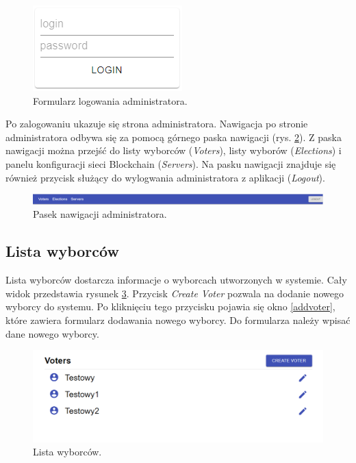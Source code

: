\documentclass[a4paper,12pt]{book}
\begin{document}
\begin{figure}[h]
	\centering
	\includegraphics[width=\textwidth]{images/adminlogin.png}
	\caption{Formularz logowania administratora.}\label{adminlogin}
\end {figure}

Po zalogowaniu ukazuje się strona administratora. Nawigacja po stronie administratora odbywa się za pomocą górnego paska nawigacji (rys. \ref{adminnav}). Z paska nawigacji można przejść do listy wyborców (\textit{Voters}), listy wyborów (\textit{Elections}) i panelu konfiguracji sieci Blockchain (\textit{Servers}). Na pasku nawigacji znajduje się również przycisk służący do wylogwania administratora z aplikacji (\textit{Logout}).

\begin{figure}[h]
	\centering
	\includegraphics[width=\textwidth]{images/adminnav.png}
	\caption{Pasek nawigacji administratora.}\label{adminnav}
\end {figure}

\newpage

\subsection{Lista wyborców}

Lista wyborców dostarcza informacje o wyborcach utworzonych w systemie. Cały widok przedstawia rysunek \ref{voterslist}. Przycisk \textit{Create Voter} pozwala na dodanie nowego wyborcy do systemu. Po kliknięciu tego przycisku pojawia się okno \ref{addvoter}, które zawiera formularz dodawania nowego wyborcy. Do formularza należy wpisać dane nowego wyborcy.

\begin{figure}[h]
	\centering
	\includegraphics[width=\textwidth]{images/voterslist.png}
	\caption{Lista wyborców.}\label{voterslist}
\end {figure}
\end{document}
